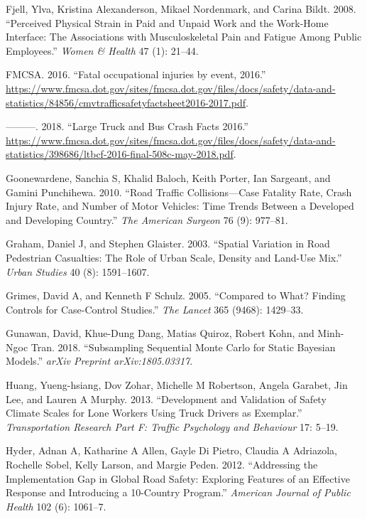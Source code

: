\documentclass[12pt]{book}
\numberwithin{equation}{chapter}
\begin{document}
\leavevmode\hypertarget{ref-fjell2008perceived}{}%
Fjell, Ylva, Kristina Alexanderson, Mikael Nordenmark, and Carina Bildt. 2008. ``Perceived Physical Strain in Paid and Unpaid Work and the Work-Home Interface: The Associations with Musculoskeletal Pain and Fatigue Among Public Employees.'' \emph{Women \& Health} 47 (1): 21--44.

\leavevmode\hypertarget{ref-fmcsafacts2016}{}%
FMCSA. 2016. ``Fatal occupational injuries by event, 2016.'' \url{https://www.fmcsa.dot.gov/sites/fmcsa.dot.gov/files/docs/safety/data-and-statistics/84856/cmvtrafficsafetyfactsheet2016-2017.pdf}.

\leavevmode\hypertarget{ref-fmcsareport2016}{}%
---------. 2018. ``Large Truck and Bus Crash Facts 2016.'' \url{https://www.fmcsa.dot.gov/sites/fmcsa.dot.gov/files/docs/safety/data-and-statistics/398686/ltbcf-2016-final-508c-may-2018.pdf}.

\leavevmode\hypertarget{ref-goonewardene2010road}{}%
Goonewardene, Sanchia S, Khalid Baloch, Keith Porter, Ian Sargeant, and Gamini Punchihewa. 2010. ``Road Traffic Collisions---Case Fatality Rate, Crash Injury Rate, and Number of Motor Vehicles: Time Trends Between a Developed and Developing Country.'' \emph{The American Surgeon} 76 (9): 977--81.

\leavevmode\hypertarget{ref-graham2003spatial}{}%
Graham, Daniel J, and Stephen Glaister. 2003. ``Spatial Variation in Road Pedestrian Casualties: The Role of Urban Scale, Density and Land-Use Mix.'' \emph{Urban Studies} 40 (8): 1591--1607.

\leavevmode\hypertarget{ref-grimes2005compared}{}%
Grimes, David A, and Kenneth F Schulz. 2005. ``Compared to What? Finding Controls for Case-Control Studies.'' \emph{The Lancet} 365 (9468): 1429--33.

\leavevmode\hypertarget{ref-gunawan2018subsampling}{}%
Gunawan, David, Khue-Dung Dang, Matias Quiroz, Robert Kohn, and Minh-Ngoc Tran. 2018. ``Subsampling Sequential Monte Carlo for Static Bayesian Models.'' \emph{arXiv Preprint arXiv:1805.03317}.

\leavevmode\hypertarget{ref-huang2013development}{}%
Huang, Yueng-hsiang, Dov Zohar, Michelle M Robertson, Angela Garabet, Jin Lee, and Lauren A Murphy. 2013. ``Development and Validation of Safety Climate Scales for Lone Workers Using Truck Drivers as Exemplar.'' \emph{Transportation Research Part F: Traffic Psychology and Behaviour} 17: 5--19.

\leavevmode\hypertarget{ref-hyder2012addressing}{}%
Hyder, Adnan A, Katharine A Allen, Gayle Di Pietro, Claudia A Adriazola, Rochelle Sobel, Kelly Larson, and Margie Peden. 2012. ``Addressing the Implementation Gap in Global Road Safety: Exploring Features of an Effective Response and Introducing a 10-Country Program.'' \emph{American Journal of Public Health} 102 (6): 1061--7.
\end{document}
